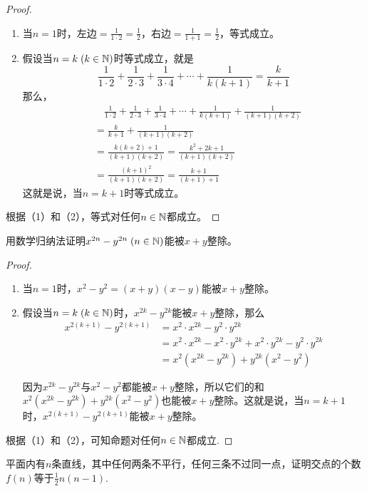 \begin{proof}
\begin{enumerate}[(1)]
    \item 当$n=1$时，左边$=\frac{1}{1\cdot 2}=\frac{1}{2}$，右边$=\frac{1}{1+1}=\frac{1}{2}$，等式成立。
   \item 假设当$n=k\; (k\in\mathbb{N})$时等式成立，就是
   \[\frac{1}{1\cdot 2}+\frac{1}{2\cdot 3}+\frac{1}{3\cdot 4}+\cdots +\frac{1}{k(k+1)}=\frac{k}{k+1}\]
   那么，
\[\begin{split}
    &\quad \frac{1}{1\cdot 2}+\frac{1}{2\cdot 3}+\frac{1}{3\cdot 4}+\cdots +\frac{1}{k(k+1)}+\frac{1}{(k+1)(k+2)}\\
    &=\frac{k}{k+1}+\frac{1}{(k+1)(k+2)}\\
    &=\frac{k(k+2)+1}{(k+1)(k+2)}=\frac{k^2+2k+1}{(k+1)(k+2)}\\
    &=\frac{(k+1)^2}{(k+1)(k+2)}=\frac{k+1}{(k+1)+1}
\end{split}\]
    这就是说，当$n=k+1$时等式成立。
\end{enumerate}

根据（1）和（2），等式对任何$n\in\mathbb{N}$都成立。
\end{proof}

\begin{example}
用数学归纳法证明$x^{2n}-y^{2n}\; (n\in\mathbb{N})$能被$x+y$整除。
\end{example}

\begin{proof}
\begin{enumerate}[(1)]
    \item 当$n=1$时，$x^2-y^2=(x+y)(x-y)$能被$x+y$整除。
    \item 假设当$n=k\; (k\in\mathbb{N})$时，$x^{2k}-y^{2k}$能被$x+y$整除，那么
\[\begin{split}
x^{2(k+1)}-y^{2(k+1)}&=x^2\cdot x^{2k}-y^2\cdot y^{2k}\\
&=x^2\cdot x^{2k}-x^2\cdot y^{2k}+x^2\cdot y^{2k}-y^2\cdot y^{2k}\\
&=x^2(x^{2k}-y^{2k})+y^{2k}(x^2-y^2)
\end{split}\]

因为$x^{2k}-y^{2k}$与$x^2-y^2$都能被$x+y$整除，所以它们的和$x^2(x^{2k}-y^{2k})+y^{2k}(x^2-y^2)$也能被$x+y$整除。这就是说，当$n=k+1$时，$x^{2(k+1)}-y^{2(k+1)}$能被$x+y$整除。
\end{enumerate}

根据（1）和（2），可知命题对任何$n\in\mathbb{N}$都成立.
\end{proof}

\begin{example}
    平面内有$n$条直线，其中任何两条不平行，任何三条不过同一点，证明交点的个数$f(n)$等于$\frac{1}{2}n(n-1)$.
\end{example}

